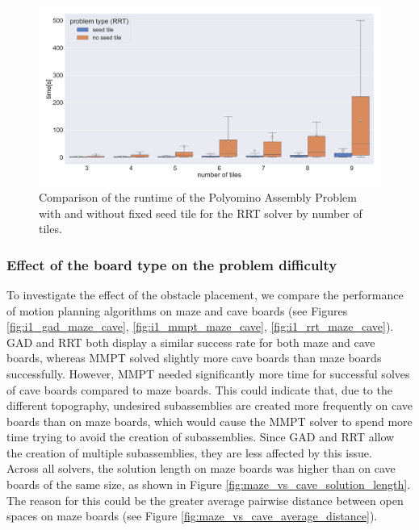 \begin{figure}[htpb]
\centering
\includegraphics[width=\textwidth]{figures/plots/heuristic_solvers_i1/rrt_i1_fixed_time_over_tiles.pdf}
\caption [Runtime comparison by problem type for RRT] {Comparison of the runtime of the Polyomino Assembly Problem with and without fixed seed tile for the RRT solver by number of tiles.}
\label{fig:rrt_fixed}
\end{figure}

\vfill

\subsubsection{Effect of the board type on the problem difficulty}

To investigate the effect of the obstacle placement, we compare the performance of motion planning algorithms on maze and cave boards (see Figures \ref{fig:i1_gad_maze_cave}, \ref{fig:i1_mmpt_maze_cave}, \ref{fig:i1_rrt_maze_cave}). GAD and RRT both display a similar success rate for both maze and cave boards, whereas MMPT solved slightly more cave boards than maze boards successfully. However, MMPT needed significantly more time for successful solves of cave boards compared to maze boards. This could indicate that, due to the different topography, undesired subassemblies are created more frequently on cave boards than on maze boards, which would cause the MMPT solver to spend more time trying to avoid the creation of subassemblies. Since GAD and RRT allow the creation of multiple subassemblies, they are less affected by this issue. \\
Across all solvers, the solution length on maze boards was higher than on cave boards of the same size, as shown in Figure \ref{fig:maze_vs_cave_solution_length}.
The reason for this could be the greater average pairwise distance between open spaces on maze boards (see Figure \ref{fig:maze_vs_cave_average_distance}).

